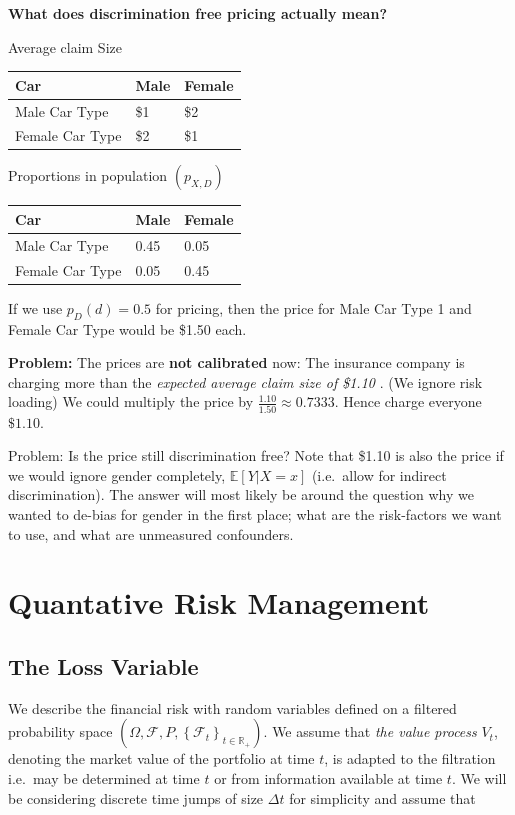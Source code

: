 \documentclass[
]{book}
\begin{document}
\textbf{What does discrimination free pricing actually mean?}

Average claim Size

\begin{longtable}[]{@{}lll@{}}
\toprule()
Car & Male & Female \\
\midrule()
\endhead
Male Car Type & \$1 & \$2 \\
Female Car Type & \$2 & \$1 \\
\bottomrule()
\end{longtable}

Proportions in population \((p_{X,D})\)

\begin{longtable}[]{@{}lll@{}}
\toprule()
Car & Male & Female \\
\midrule()
\endhead
Male Car Type & 0.45 & 0.05 \\
Female Car Type & 0.05 & 0.45 \\
\bottomrule()
\end{longtable}

If we use \(p_D(d) = 0.5\) for pricing, then the price for Male Car Type 1 and Female Car Type would be \$1.50 each.

\textbf{Problem:} The prices are \textbf{not calibrated} now: The insurance company is charging more than the \emph{expected average claim size of \$1.10 }. (We ignore risk loading) We could multiply the price by \(\frac{1.10}{1.50}\approx 0.7333\). Hence charge everyone \(\$1.10\).

Problem: Is the price still discrimination free? Note that \$1.10 is also the price if we would ignore gender completely, \(\mathbb E[Y|X=x]\) (i.e.~allow for indirect discrimination). The answer will most likely be around the question why we wanted to de-bias for gender in the first place; what are the risk-factors we want to use, and what are unmeasured confounders.

\hypertarget{quantative-risk-management}{%
\chapter{Quantative Risk Management}\label{quantative-risk-management}}

\hypertarget{the-loss-variable}{%
\section{The Loss Variable}\label{the-loss-variable}}

We describe the financial risk with random variables defined on a filtered probability space \(\left(\Omega,\mathcal{F},P,\left\{\mathcal{F}_t\right\}_{t\in \mathbb{R}_+}\right)\). We assume that \emph{the value process} \(V_t\), denoting the market value of the portfolio at time \(t\), is adapted to the filtration i.e.~may be determined at time \(t\) or from information available at time \(t\). We will be considering discrete time jumps of size \(\Delta t\) for simplicity and assume that
\end{document}
